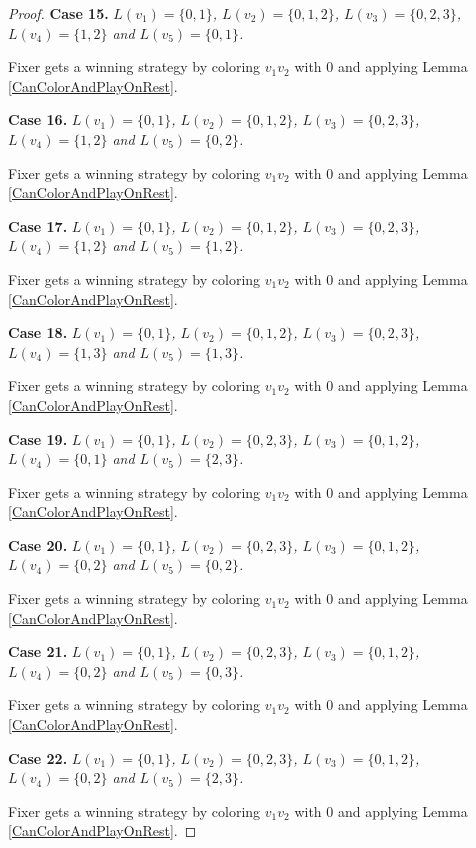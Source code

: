\documentclass[12pt]{amsart}
\theoremstyle{plain}
\theoremstyle{definition}
\theoremstyle{remark}
\begin{document}
\begin{proof}
\noindent\textbf{Case 15.  }\textit{$L(v_1) = \{0, 1\}$, $L(v_2) = \{0, 1, 2\}$, $L(v_3) = \{0, 2, 3\}$, $L(v_4) = \{1, 2\}$ and $L(v_5) = \{0, 1\}$.}

Fixer gets a winning strategy by coloring $v_1v_2$ with $0$ and applying Lemma \ref{CanColorAndPlayOnRest}.

\noindent\textbf{Case 16.  }\textit{$L(v_1) = \{0, 1\}$, $L(v_2) = \{0, 1, 2\}$, $L(v_3) = \{0, 2, 3\}$, $L(v_4) = \{1, 2\}$ and $L(v_5) = \{0, 2\}$.}

Fixer gets a winning strategy by coloring $v_1v_2$ with $0$ and applying Lemma \ref{CanColorAndPlayOnRest}.

\noindent\textbf{Case 17.  }\textit{$L(v_1) = \{0, 1\}$, $L(v_2) = \{0, 1, 2\}$, $L(v_3) = \{0, 2, 3\}$, $L(v_4) = \{1, 2\}$ and $L(v_5) = \{1, 2\}$.}

Fixer gets a winning strategy by coloring $v_1v_2$ with $0$ and applying Lemma \ref{CanColorAndPlayOnRest}.

\noindent\textbf{Case 18.  }\textit{$L(v_1) = \{0, 1\}$, $L(v_2) = \{0, 1, 2\}$, $L(v_3) = \{0, 2, 3\}$, $L(v_4) = \{1, 3\}$ and $L(v_5) = \{1, 3\}$.}

Fixer gets a winning strategy by coloring $v_1v_2$ with $0$ and applying Lemma \ref{CanColorAndPlayOnRest}.

\noindent\textbf{Case 19.  }\textit{$L(v_1) = \{0, 1\}$, $L(v_2) = \{0, 2, 3\}$, $L(v_3) = \{0, 1, 2\}$, $L(v_4) = \{0, 1\}$ and $L(v_5) = \{2, 3\}$.}

Fixer gets a winning strategy by coloring $v_1v_2$ with $0$ and applying Lemma \ref{CanColorAndPlayOnRest}.

\noindent\textbf{Case 20.  }\textit{$L(v_1) = \{0, 1\}$, $L(v_2) = \{0, 2, 3\}$, $L(v_3) = \{0, 1, 2\}$, $L(v_4) = \{0, 2\}$ and $L(v_5) = \{0, 2\}$.}

Fixer gets a winning strategy by coloring $v_1v_2$ with $0$ and applying Lemma \ref{CanColorAndPlayOnRest}.

\noindent\textbf{Case 21.  }\textit{$L(v_1) = \{0, 1\}$, $L(v_2) = \{0, 2, 3\}$, $L(v_3) = \{0, 1, 2\}$, $L(v_4) = \{0, 2\}$ and $L(v_5) = \{0, 3\}$.}

Fixer gets a winning strategy by coloring $v_1v_2$ with $0$ and applying Lemma \ref{CanColorAndPlayOnRest}.

\noindent\textbf{Case 22.  }\textit{$L(v_1) = \{0, 1\}$, $L(v_2) = \{0, 2, 3\}$, $L(v_3) = \{0, 1, 2\}$, $L(v_4) = \{0, 2\}$ and $L(v_5) = \{2, 3\}$.}

Fixer gets a winning strategy by coloring $v_1v_2$ with $0$ and applying Lemma \ref{CanColorAndPlayOnRest}.


\end{proof}
\end{document}
